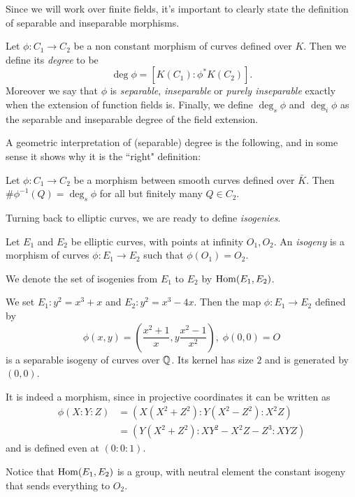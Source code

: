 Since we will work over finite fields, it's important to clearly state the definition of separable and inseparable morphisms.

\begin{definition}
    Let $\phi:C_1\to C_2$ be a non constant morphism of curves defined over $K$. Then we define its \emph{degree} to be $$\deg\phi = [K(C_1):\phi^\ast K(C_2)].$$
    Moreover we say that $\phi$ is \emph{separable}, \emph{inseparable} or \emph{purely inseparable} exactly when the extension of function fields is. Finally, we define $\deg_s\phi$ and $\deg_i\phi$ as the separable and inseparable degree of the field extension.
\end{definition}

A geometric interpretation of (separable) degree is the following, and in some sense it shows why it is the ``right" definition:

\begin{proposition}
    Let $\phi: C_1\to C_2$ be a morphism between smooth curves defined over $\bar K$. Then $\#\phi^{-1}(Q)=\deg_s\phi$ for all but finitely many $Q\in C_2$.
\end{proposition}

Turning back to elliptic curves, we are ready to define \emph{isogenies}.
\begin{definition}
    Let $E_1$ and $E_2$ be elliptic curves, with points at infinity $O_1,O_2$. An \emph{isogeny} is a morphism of curves $\phi:E_1\to E_2$ such that $\phi(O_1)=O_2$.
    
    We denote the set of isogenies from $E_1$ to $E_2$ by $\operatorname{Hom}(E_1, E_2)$.
\end{definition}

\begin{example}
    We set $E_1:y^2=x^3+x$ and $E_2:y^2=x^3-4x$. Then the map $\phi:E_1\to E_2$ defined by $$\phi(x,y)=\left(\frac{x^2+1}{x}, y\frac{x^2-1}{x^2}\right), \;\phi(0,0)=O$$ is a separable isogeny of curves over $\mathbb{Q}$. Its kernel has size $2$ and is generated by $(0,0)$.
    
    It is indeed a morphism, since in projective coordinates it can be written as
    \begin{align*}
    \phi(X:Y:Z) &= (X(X^2+Z^2):Y(X^2-Z^2):X^2Z)\\
    &= (Y(X^2+Z^2):XY^2-X^2Z-Z^3:XYZ)
    \end{align*}
    and is defined even at $(0:0:1)$.
\end{example}

Notice that $\operatorname{Hom}(E_1, E_2)$ is a group, with neutral element the constant isogeny that sends everything to $O_2$.

